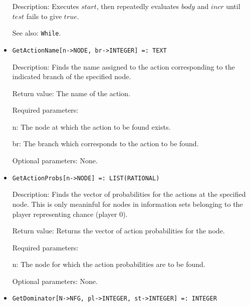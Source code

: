 \begin{itemize}
\bd
\item
[Description:] Executes $start$, then repeatedly evaluates $body$ and $incr$
until $test$ fails to give $true$.
\item
[See also:] \verb+While+.
\ed


\item
\protect \large \begin{verbatim}
GetActionName[n->NODE, br->INTEGER] =: TEXT
\end{verbatim}\normalsize

\bd
\item
[Description:] Finds the name assigned to the action corresponding to
the indicated branch of the specified node.
\item   
[Return value:] The name of the action.
\item
[Required parameters:]\hfil\null
	
\bd
\item
[n:] The node at which the action to be found exists.
\item
[br:] The branch which corresponds to the action to be found.
\ed

\item
[Optional parameters:] None.
\ed

\item
\protect \large \begin{verbatim}
GetActionProbs[n->NODE] =: LIST(RATIONAL)
\end{verbatim}\normalsize

\bd
\item
[Description:] Finds the vector of probabilities for the actions at
the specified node.  This is only meaninful for nodes in information
sets belonging to the player representing chance (player 0).
\item
[Return value:] Returns the vector of action probabilities for the
node.
\item
[Required parameters:]\hfil\null
	
\bd
\item
[n:] The node for which the action probabilities are to be found.
\ed

\item
[Optional parameters:] None.
\ed

\item
\protect \large \begin{verbatim}
GetDominator[N->NFG, pl->INTEGER, st->INTEGER] =: INTEGER
\end{verbatim}\normalsize


\end{itemize}
